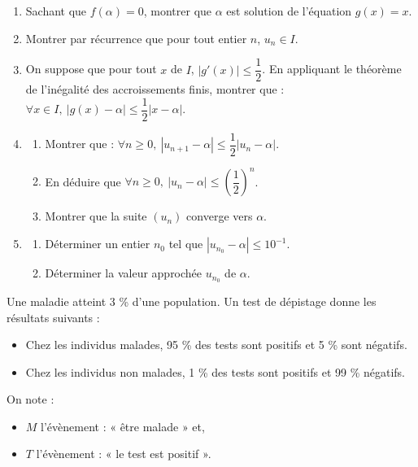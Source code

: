 \documentclass[11pt]{article}
\begin{document}
\begin{enumerate}
  \item Sachant que $f(\alpha) = 0$, montrer que $\alpha$ est solution de l'équation $g(x) = x$.
  \item Montrer par récurrence que pour tout entier $n$, $u_n \in I$.
  \item On suppose que pour tout $x$ de $I$, $|g'(x)| \le \dfrac{1}{2}$. En appliquant le théorème de l'inégalité des accroissements finis, montrer que : $\forall x \in I,\ |g(x) - \alpha| \le \dfrac{1}{2}|x - \alpha|$.
  \item \begin{enumerate}[label=\alph*.]
    \item Montrer que : $\forall n \ge 0,\ |u_{n+1} - \alpha| \le \dfrac{1}{2}|u_n - \alpha|$.
    \item En déduire que $\forall n \ge 0,\ |u_n - \alpha| \le \left(\dfrac{1}{2}\right)^n$.
    \item Montrer que la suite $(u_n)$ converge vers $\alpha$.
  \end{enumerate}
  \item \begin{enumerate}[label=\alph*.]
    \item Déterminer un entier $n_0$ tel que $|u_{n_0} - \alpha| \le 10^{-1}$.
    \item Déterminer la valeur approchée $u_{n_0}$ de $\alpha$.
  \end{enumerate}
\end{enumerate}


Une maladie atteint 3 \% d'une population. Un test de dépistage donne les résultats suivants :
\begin{itemize}
  \item Chez les individus malades, 95 \% des tests sont positifs et 5 \% sont négatifs.
  \item Chez les individus non malades, 1 \% des tests sont positifs et 99 \% négatifs.
\end{itemize}
On note :
\begin{itemize}
  \item $M$ l'évènement : « être malade » et,
  \item $T$ l'évènement : « le test est positif ».
\end{itemize}
\end{document}
